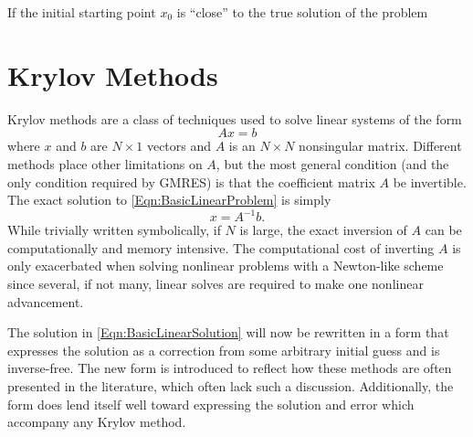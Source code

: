 \documentclass[Prelim,12pt]{WisconsinThesis}
\newcommand{\by}    {\!\times\!}
\begin{document}
If the initial starting point $x_0$ is ``close'' to the true solution of the problem





\section{Krylov Methods}
Krylov methods are a class of techniques used to solve linear systems of the form
\begin{equation}
    A x = b
    \label{Eqn:BasicLinearProblem}
\end{equation}
where $x$ and $b$ are $N \by 1$ vectors and $A$ is an $N \by N$ nonsingular matrix.
Different methods place other limitations on $A$, but the most general condition (and the only condition required by GMRES) is that the coefficient matrix $A$ be invertible.
The exact solution to \cref{Eqn:BasicLinearProblem} is simply
\begin{equation}
    x = A^{-1} b.
    \label{Eqn:BasicLinearSolution}
\end{equation}
While trivially written symbolically, if $N$ is large, the exact inversion of $A$ can be computationally and memory intensive.
The computational cost of inverting $A$ is only exacerbated when solving nonlinear problems with a Newton-like scheme since several, if not many, linear solves are required to make one nonlinear advancement.



The solution in \cref{Eqn:BasicLinearSolution} will now be rewritten in a form that expresses the solution as a correction from some arbitrary initial guess and is inverse-free.
The new form is introduced to reflect how these methods are often presented in the literature, which often lack such a discussion.
Additionally, the form does lend itself well toward expressing the solution and error which accompany any Krylov method.
\end{document}
